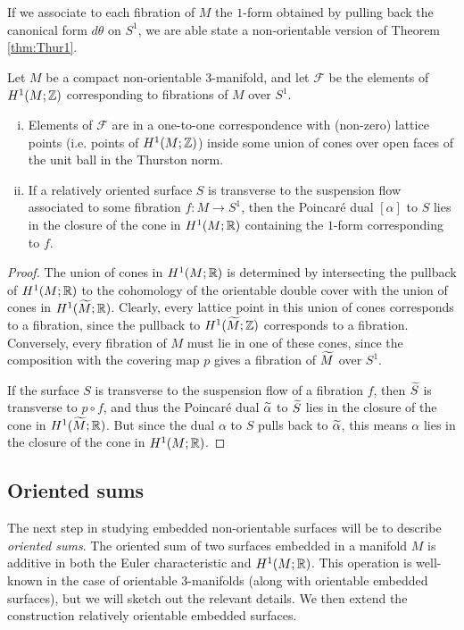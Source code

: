 If we associate to each fibration of $M$ the $1$-form obtained by pulling back the canonical form $d\theta$ on $S^1$, we are able state a non-orientable version of Theorem \ref{thm:Thur1}.
\begin{thm}
  \label{thm:classifying-fibrations}
  Let $M$ be a compact non-orientable $3$-manifold, and let $\mathcal{F}$ be the elements of $H^1(M; \mathbb{Z})$ corresponding to fibrations of $M$ over $S^1$.
  \begin{enumerate}[(i)]
  \item Elements of $\mathcal{F}$ are in a one-to-one correspondence with (non-zero) lattice points (i.e. points of $H^1(M; \mathbb{Z})$) inside some union of cones over open faces of the unit ball in the Thurston norm.
  \item If a relatively oriented surface $S$ is transverse to the suspension flow associated to some fibration $f: M \to S^1$, then the Poincar\'e dual $[\alpha]$ to $S$ lies in the  closure of the cone in $H^1(M; \mathbb{R})$ containing the $1$-form corresponding to $f$.
  \end{enumerate}
\end{thm}
\begin{proof}
  The union of cones in $H^1(M; \mathbb{R})$ is determined by intersecting the pullback of $H^1(M; \mathbb{R})$ to the cohomology of the orientable double cover with the union of cones in $H^1(\widetilde{M}; \mathbb{R})$.
  Clearly, every lattice point in this union of cones corresponds to a fibration, since the pullback to $H^1(\widetilde{M}; \mathbb{Z})$ corresponds to a fibration.
  Conversely, every fibration of $M$ must lie in one of these cones, since the composition with the covering map $p$ gives a fibration of $\widetilde{M}$ over $S^1$.

  If the surface $S$ is transverse to the suspension flow of a fibration $f$, then $\widetilde{S}$ is transverse to $p \circ f$, and thus the Poincar\'e dual $\widetilde{\alpha}$ to $\widetilde{S}$ lies in the closure of the cone in $H^1(\widetilde{M}; \mathbb{R})$.
  But since the dual $\alpha$ to $S$ pulls back to $\widetilde{\alpha}$, this means $\alpha$ lies in the closure of the cone in $H^1(M; \mathbb{R})$.
\end{proof}

\subsection{Oriented sums}
\label{sec:oriented-sums}

The next step in studying embedded non-orientable surfaces will be to describe \emph{oriented sums}.
The oriented sum of two surfaces embedded in a manifold $M$ is additive in both the Euler characteristic and $H^1(M;\mathbb{R})$.
This operation is well-known in the case of orientable $3$-manifolds (along with orientable embedded surfaces), but we will sketch out the relevant details.
We then extend the construction relatively orientable embedded surfaces.

